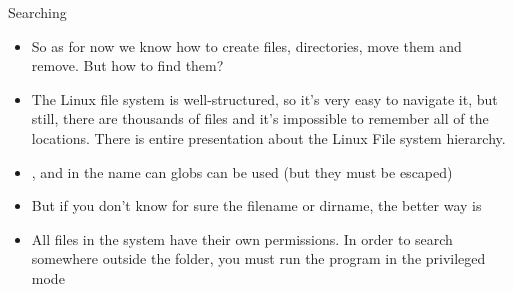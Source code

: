 \documentclass[usenames,dvipsnames,10pt,aspectratio=169]{beamer}
\begin{document}
\begin{frame}{Searching}
    \begin{itemize}
        \item So as for now we know how to create files, directories, move them and remove. But how to find them?
        \item The Linux file system is well-structured, so it's very easy to navigate it, but still, there are thousands of files and it's impossible to remember all of the locations. There is entire presentation about the Linux File system hierarchy.
        \item {}, and in the name can globs can be used (but they must be escaped)
        \item But if you don't know for sure the filename or dirname, the better way is 
        \item {} All files in the system have their own permissions. In order to search somewhere outside the  folder, you must run the program in the privileged mode
        
    \end{itemize}
\end{frame}
\end{document}
